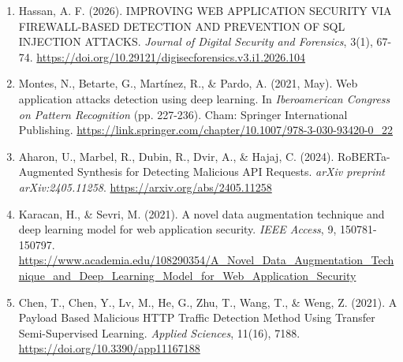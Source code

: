 \documentclass[12pt,a4paper]{article}
\begin{document}
\begin{enumerate}
    \item \label{ref1} Hassan, A. F. (2026). IMPROVING WEB APPLICATION SECURITY VIA FIREWALL-BASED DETECTION AND PREVENTION OF SQL INJECTION ATTACKS. \textit{Journal of Digital Security and Forensics}, 3(1), 67-74. \url{https://doi.org/10.29121/digisecforensics.v3.i1.2026.104}

    \item \label{ref2} Montes, N., Betarte, G., Martínez, R., \& Pardo, A. (2021, May). Web application attacks detection using deep learning. In \textit{Iberoamerican Congress on Pattern Recognition} (pp. 227-236). Cham: Springer International Publishing. \url{https://link.springer.com/chapter/10.1007/978-3-030-93420-0_22}

    \item \label{ref3} Aharon, U., Marbel, R., Dubin, R., Dvir, A., \& Hajaj, C. (2024). RoBERTa-Augmented Synthesis for Detecting Malicious API Requests. \textit{arXiv preprint arXiv:2405.11258}. \url{https://arxiv.org/abs/2405.11258}

    \item \label{ref4} Karacan, H., \& Sevri, M. (2021). A novel data augmentation technique and deep learning model for web application security. \textit{IEEE Access}, 9, 150781-150797. \url{https://www.academia.edu/108290354/A_Novel_Data_Augmentation_Technique_and_Deep_Learning_Model_for_Web_Application_Security}

    \item \label{ref5} Chen, T., Chen, Y., Lv, M., He, G., Zhu, T., Wang, T., \& Weng, Z. (2021). A Payload Based Malicious HTTP Traffic Detection Method Using Transfer Semi-Supervised Learning. \textit{Applied Sciences}, 11(16), 7188. \url{https://doi.org/10.3390/app11167188}
\end{enumerate}
\end{document}
